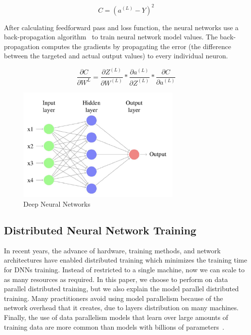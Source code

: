 \documentclass[conference]{IEEEtran}
\begin{document}
\begin{equation}
C = ( a^{(L)} - Y )^2
\end{equation}

After calculating feedforward pass and loss function, the neural networks use a back-propagation algorithm~\cite{rumelhart:errorpropnonote} to train neural network model values. The back-propagation computes the gradients by propagating the error (the difference between the targeted and actual output values) to every individual neuron.

\begin{equation}
\frac{\partial{C}}{\partial{W^{L}}} = \frac{\partial{Z}^{(L)}}{\partial{W^{(L)}}} * \frac{\partial{a^{(L)}}}{\partial{Z^{(L)}}} *  \frac{\partial{C}}{\partial{a^{(L)}}}
\end{equation} 



\begin{figure}[htb]
\includegraphics[width=3.2in]{Fig/DNN_1.jpg}
\caption{Deep Neural Networks}
\label{fig:DDNNs}
\end{figure}


\subsection{Distributed Neural Network Training}

In recent years, the advance of hardware, training methods, and network architectures have enabled distributed training which minimizes the training time for DNNs training. Instead of restricted to a single machine, now we can scale to as many resources as required. In this paper, we choose to perform on data parallel distributed training, but we also explain the model parallel distributed training. Many practitioners avoid using model parallelism because of the network overhead that it creates, due to layers distribution on many machines. Finally, the use of data parallelism models that learn over large amounts of training data are more common than models with billions of parameters~\cite{li2015malt}. 
\end{document}
